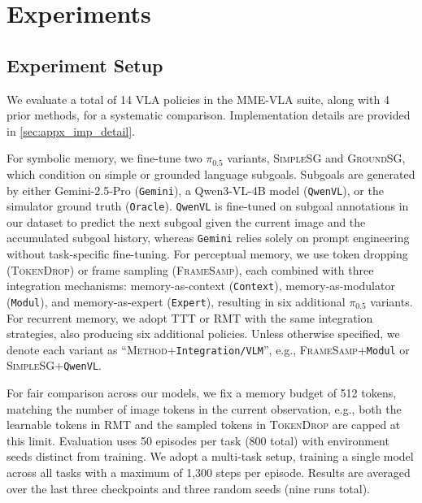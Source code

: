 \section{Experiments}
\label{sec:experiments}

\subsection{Experiment Setup}
We evaluate a total of 14 VLA policies in the MME-VLA suite, along with 4 prior methods, for a systematic comparison. Implementation details are provided in \cref{sec:appx_imp_detail}.

\noindent{\bf \modelname\xspace Suite.}
For symbolic memory, we fine-tune two $\pi_{0.5}$ variants, \textsc{SimpleSG} and \textsc{GroundSG}, which condition on simple or grounded language subgoals. Subgoals are generated by either Gemini-2.5-Pro (\texttt{Gemini}), a Qwen3-VL-4B model (\texttt{QwenVL}), or the simulator ground truth (\texttt{Oracle}).
\texttt{QwenVL} is fine-tuned on subgoal annotations in our dataset to predict the next subgoal given the current image and the accumulated subgoal history, whereas \texttt{Gemini} relies solely on prompt engineering without task-specific fine-tuning.
For perceptual memory, we use token dropping (\textsc{TokenDrop}) or frame sampling (\textsc{FrameSamp}), each combined with three integration mechanisms: memory-as-context (\texttt{Context}), memory-as-modulator (\texttt{Modul}), and memory-as-expert (\texttt{Expert}), resulting in six additional $\pi_{0.5}$ variants.
For recurrent memory, we adopt \textsc{TTT} or \textsc{RMT} with the same integration strategies, also  producing six additional policies.
Unless otherwise specified, we denote each variant as ``\textsc{Method}+\texttt{Integration/VLM}'', e.g., \textsc{FrameSamp}+\texttt{Modul} or \textsc{SimpleSG}+\texttt{QwenVL}.

For fair comparison across our \modelname\xspace models, we fix a memory budget of 512 tokens, matching the number of image tokens in the current observation, e.g., both the learnable tokens in \textsc{RMT} and the sampled tokens in \textsc{TokenDrop} are capped at this limit.
Evaluation uses 50 episodes per task (800 total) with environment seeds distinct from training. We adopt a multi-task setup, training a single model across all tasks with a maximum of 1,300 steps per episode. Results are averaged over the last three checkpoints and three random seeds (nine runs total).

